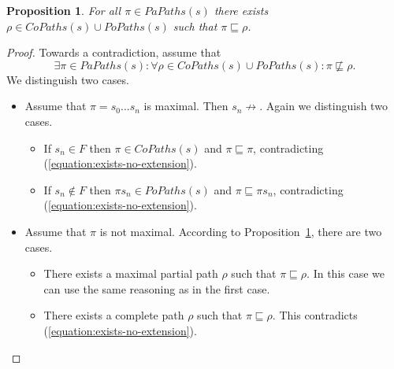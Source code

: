 \documentclass[12pt]{article}
\newtheorem{proposition}{Proposition}
\theoremstyle{definition}
\newenvironment{franck}{\color{red}}{\color{black}}
\begin{document}
\begin{franck}
\begin{proposition}
\label{proposition:partial-path-extension}
For all $\pi \in \mathit{PaPaths}(s)$ there exists $\rho \in \mathit{CoPaths}(s) \cup \mathit{PoPaths}(s)$ such that $\pi \sqsubseteq \rho$.
\end{proposition}
\begin{proof}
Towards a contradiction, assume that 
\begin{equation}
\label{equation:exists-no-extension}
\exists \pi \in \mathit{PaPaths}(s) : \forall \rho \in \mathit{CoPaths}(s) \cup \mathit{PoPaths}(s) : \pi \not\sqsubseteq \rho.
\end{equation}
We distinguish two cases.
\begin{itemize}
\item 
Assume that $\pi = s_0 \ldots s_n$ is maximal.  Then $s_n \not\rightarrow$.  Again we distinguish two cases.
\begin{itemize}
\item 
If $s_n \in F$ then $\pi \in \mathit{CoPaths}(s)$ and $\pi \sqsubseteq \pi$, contradicting (\ref{equation:exists-no-extension}).
\item
If $s_n \not\in F$ then $\pi s_n \in \mathit{PoPaths}(s)$ and $\pi \sqsubseteq \pi s_n$, contradicting (\ref{equation:exists-no-extension}).
\end{itemize}
\item
Assume that $\pi$ is not maximal. According to Proposition~\ref{proposition:partial-path-extension}, there are two cases.
\begin{itemize}
\item 
There exists a maximal partial path $\rho$ such that $\pi \sqsubseteq \rho$.  In this case we can use the same reasoning as in the first case.
\item
There exists a complete path $\rho$ such that $\pi \sqsubseteq \rho$.  This contradicts (\ref{equation:exists-no-extension}). 
\end{itemize} 
\end{itemize}
\end{proof}


\end{franck}
\end{document}
